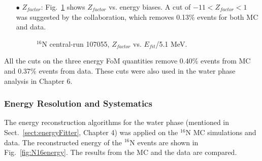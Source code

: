 \begin{itemize}
	\item[$\bullet$]$Z_{factor}$:
	Fig.~\ref{energyFOM_Zfactor} shows $Z_{factor}$ vs. energy biases. A cut of $-11<Z_{factor}<1$ was suggested by the collaboration, which removes 0.13\% events for both MC and data.		
	\begin{figure}[!htb]
		\centering
		\caption{$^{16}$N central-run 107055, $Z_{factor}$ vs. $E_{fit}$/5.1 MeV.}
		\label{energyFOM_Zfactor}
	\end{figure}
	
	
\end{itemize}

All the cuts on the three energy FoM quantities remove 0.40\% events from MC and 0.37\% events from data. These cuts were also used in the water phase analysis in Chapter 6.

\subsubsection{Energy Resolution and Systematics}
The energy reconstruction algorithms for the water phase (mentioned in Sect.~\ref{sect:energyFitter}, Chapter 4) was applied on the $^{16}$N MC simulations and data. The reconstructed energy of the $^{16}$N events are shown in Fig.~\ref{fig:N16energy}. The results from the MC and the data are compared.

